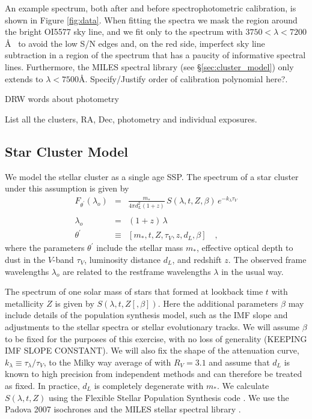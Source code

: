 \documentclass[iop,numberedappendix]{emulateapj}
\begin{document}
An example spectrum, both after and before spectrophotometric
calibration, is shown in Figure \ref{fig:data}.  When fitting the
spectra we mask the region around the bright OI5577 sky line, and we
fit only to the spectrum with $3750 < \lambda < 7200$\AA~ to avoid the low
S/N edges and, on the red side, imperfect sky line subtraction in a
region of the spectrum that has a paucity of informative spectral
lines. Furthermore, the MILES spectral library (see
\S\ref{sec:cluster_model}) only extends to $\lambda < 7500$\AA.
{\color{red} Specify/Justify order of calibration polynomial here?}.

{\color{blue} DRW words about photometry}

\begin{table}[h!]
\caption{List all the clusters, RA, Dec, photometry and individual exposures.}
\end{table}

\subsection{Star Cluster Model}
We model the stellar cluster as a single age SSP. The spectrum of a
star cluster under this assumption is given by
\begin{eqnarray}\displaystyle
F_{\theta^\prime}(\lambda_o) & = &
\frac{m_*}{4\pi d_L^2(1+z)} \, S(\lambda, t, Z , \beta) \, e^ {-k_\lambda\tau_V} \\
\nonumber \\ 
\lambda_o & = & (1+z)\,\lambda 
\\
\theta^\prime & \equiv & \left[ m_*, t, Z, \tau_V, z, d_L, \beta \right]
\quad ,
\end{eqnarray} where the
parameters $\theta^\prime$ include 
the stellar mass $m_*$, 
effective optical depth to dust in the $V$-band $\tau_V$, 
luminosity distance $d_L$,
and redshift $z$.  
The observed frame wavelengths $\lambda_o$ are related to the restframe
wavelengths $\lambda$ in the usual way.

The spectrum of one solar mass of stars that formed at lookback time
$t$ with metallicity $Z$ is given by $S(\lambda, t, Z [, \beta])$.
Here the additional parameters $\beta$ may include details of the
population synthesis model, such as the IMF slope and adjustments to
the stellar spectra or stellar evolutionary tracks. We will assume
$\beta$ to be fixed for the purposes of this exercise, with no loss of
generality {\color{blue} (KEEPING IMF SLOPE CONSTANT)}.  We will also
fix the shape of the attenuation curve, $k_\lambda \equiv
\tau_\lambda/\tau_V$, to the Milky way average of \citet{CCM89} with
$R_V=3.1$ and assume that $d_L$ is known to high precision from
independent methods and can therefore be treated as fixed.  In
practice, $d_L$ is completely degenerate with $m_*$. We calculate
$S(\lambda, t, Z)$ using the Flexible Stellar Population Synthesis
code \citep[FSPS][]{fsps}.  We use the Padova 2007 isochrones
\citep{girardi00, bertilli94, marigo07} and the MILES stellar spectral
library \citep{miles_I, miles_II, miles_III}.
\end{document}
